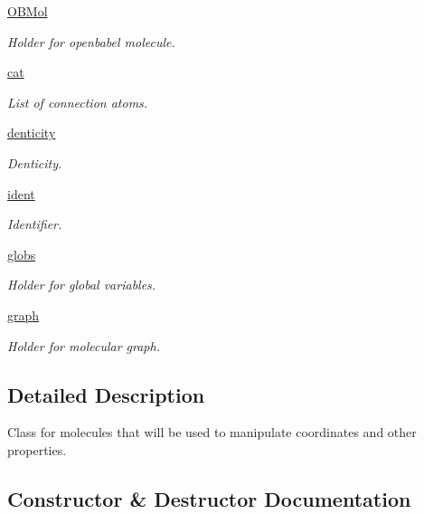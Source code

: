 \begin{DoxyCompactItemize}
\hyperlink{classmolSimplify_1_1Classes_1_1mol3D_1_1mol3D_ac6f2ce6966f1126c52b32f0aa40612a4}{O\+B\+Mol}
\begin{DoxyCompactList}\small\item\em Holder for openbabel molecule. \end{DoxyCompactList}\item 
\hyperlink{classmolSimplify_1_1Classes_1_1mol3D_1_1mol3D_a7cec79699a619b85d5e23e869327749b}{cat}
\begin{DoxyCompactList}\small\item\em List of connection atoms. \end{DoxyCompactList}\item 
\hyperlink{classmolSimplify_1_1Classes_1_1mol3D_1_1mol3D_a5bdeed75bc96b42a06b2ea277b431739}{denticity}
\begin{DoxyCompactList}\small\item\em Denticity. \end{DoxyCompactList}\item 
\hyperlink{classmolSimplify_1_1Classes_1_1mol3D_1_1mol3D_a606148a9c1137fcad6528b1e5c34a5c4}{ident}
\begin{DoxyCompactList}\small\item\em Identifier. \end{DoxyCompactList}\item 
\hyperlink{classmolSimplify_1_1Classes_1_1mol3D_1_1mol3D_a6f203eafd5348c5bd650356edda9b84a}{globs}
\begin{DoxyCompactList}\small\item\em Holder for global variables. \end{DoxyCompactList}\item 
\hyperlink{classmolSimplify_1_1Classes_1_1mol3D_1_1mol3D_aa14392db397618bd85a06f44f43360a2}{graph}
\begin{DoxyCompactList}\small\item\em Holder for molecular graph. \end{DoxyCompactList}\end{DoxyCompactItemize}


\subsection{Detailed Description}
Class for molecules that will be used to manipulate coordinates and other properties. 

\subsection{Constructor \& Destructor Documentation}
\mbox{\label{classmolSimplify_1_1Classes_1_1mol3D_1_1mol3D_ad12e0f1f0f180b0ed25d8d9aee9e7a82}} 
